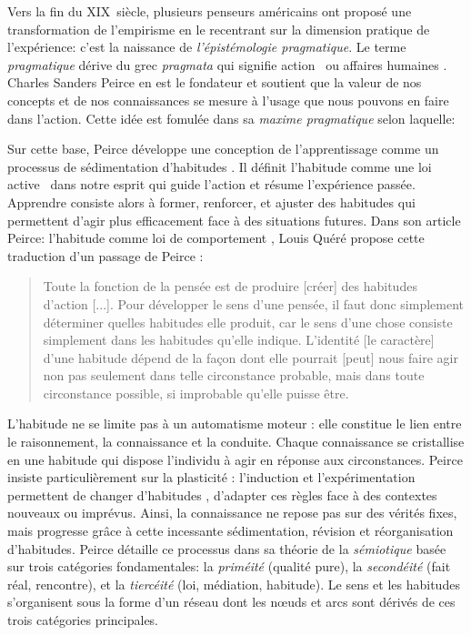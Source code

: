 \noindent
Vers la fin du XIX\ieme{}~siècle, plusieurs penseurs américains ont proposé une transformation de l'empirisme en le recentrant sur la dimension pratique de l'expérience: c'est la naissance de \emph{l'épistémologie pragmatique}. 
Le terme \emph{pragmatique} dérive du grec \emph{pragmata} qui signifie \og action \fg\ ou \og affaires humaines \fg.
Charles Sanders Peirce en est le fondateur et soutient que la valeur de nos concepts et de nos connaissances se mesure à l'usage que nous pouvons en faire dans l'action. 
Cette idée est fomulée dans sa \emph{maxime pragmatique} selon laquelle: 
\begin{quote}
\cite{peirce_how_1878}
\end{quote}

Sur cette base, Peirce développe une conception de l'apprentissage comme un processus de \og sédimentation d'habitudes \fg.
Il définit l'habitude comme une  \og loi active \fg\ dans notre esprit qui guide l'action et résume l'expérience passée.  
Apprendre consiste alors à former, renforcer, et ajuster des habitudes qui permettent d'agir plus efficacement face à des situations futures.  
Dans son article \og Peirce: l'habitude comme loi de comportement \fg, Louis Quéré propose cette traduction d'un passage de Peirce :

\begin{quote}
\og Toute la fonction de la pensée est de produire [créer] des habitudes d’action [...]. 
Pour développer le sens d’une pensée, il faut donc simplement déterminer quelles habitudes elle produit, car le sens d’une chose consiste simplement dans les habitudes qu’elle indique. 
L’identité [le caractère] d’une habitude dépend de la façon dont elle pourrait [peut] nous faire agir non pas seulement dans telle circonstance probable, mais dans toute circonstance possible, si improbable qu’elle puisse être. \fg\ 
\cite[p.~3]{quere_peirce_2018}
\end{quote} 

L'habitude ne se limite pas à un automatisme moteur : elle constitue le lien entre le raisonnement, la connaissance et la conduite.
Chaque connaissance se cristallise en une habitude qui dispose l’individu à agir en réponse aux circonstances. 
Peirce insiste particulièrement sur la plasticité :
l’induction et l’expérimentation permettent de \og changer d’habitudes \fg, d’adapter ces règles face à des contextes nouveaux ou imprévus. 
Ainsi, la connaissance ne repose pas sur des vérités fixes, mais progresse grâce à cette incessante sédimentation, révision et réorganisation d’habitudes.
Peirce détaille ce processus dans sa théorie de la \emph{sémiotique} basée sur trois catégories fondamentales: la \emph{priméité} (qualité pure), la \emph{secondéité} (fait réal, rencontre), et la \emph{tiercéité} (loi, médiation, habitude).
Le sens et les habitudes s'organisent sous la forme d'un réseau dont les n\oe uds et arcs sont dérivés de ces trois catégories principales. 

